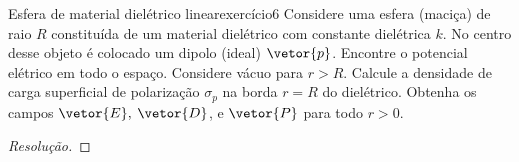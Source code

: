 \begin{exercício}{Esfera de material dielétrico linear}{exercício6}
    Considere uma esfera (maciça) de raio \(R\) constituída de um material dielétrico com constante dielétrica \(k\). No centro desse objeto é colocado um dipolo (ideal) \(\vetor{p}\). Encontre o potencial elétrico em todo o espaço. Considere vácuo para \(r > R\). Calcule a densidade de carga superficial de polarização \(\sigma_p\) na borda \(r = R\) do dielétrico. Obtenha os campos \(\vetor{E},\) \(\vetor{D}\), e \(\vetor{P}\) para todo \(r > 0\).
\end{exercício}
\begin{proof}[Resolução]

\end{proof}
